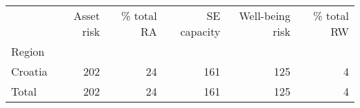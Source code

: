 \begin{tabular}{lrrrrr}
\toprule
{} &  Asset risk &  \% total RA &  SE capacity &  Well-being risk &  \% total RW \\
Region  &             &             &              &                  &             \\
\midrule
Croatia &         202 &          24 &          161 &              125 &           4 \\
Total   &         202 &          24 &          161 &              125 &           4 \\
\bottomrule
\end{tabular}
